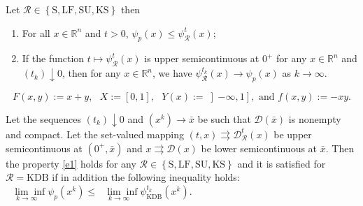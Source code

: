 \documentclass[10pt,a4paper]{amsart}
\begin{document}
\begin{theorem} \label{fprop}
Let $\mathcal{R}\in \left\{\mbox{S}, \mbox{LF}, \mbox{SU}, \mbox{KS}\right\}$ then 
\begin{enumerate}
\item[$(a)$]  For all $x\in \mathbb{R}^n$ and $t>0$, $\psi_p(x) \leq \psi^t_{\mathcal{R}}(x)$;
\item[$(b)$] If the function  $t\mapsto\psi_{\mathcal{R}}^{t}(x)$ is  upper semicontinuous at $0^+$ for any $x\in \mathbb{R}^n$ and
	 $(t_{k})\downarrow0$, then for any $x\in\mathbb{R}^{n}$, we have
	$\psi_{\mathcal{R}}^{t_{k}}(x)\rightarrow\psi_{p}(x)$ as $k\rightarrow\infty$.
\end{enumerate}
\end{theorem}

\begin{equation}
F(x,y):=x+y,\text{ \ }X:=[0,1],\text{ \ }Y(x):=\left]  -\infty,1\right]
,\text{ and \ \ }f(x,y):=-xy. \label{e1}
\end{equation}

\begin{proposition} \label{cs}
Let the sequences $(t_{k})\downarrow0$ and $(x^{k}) \rightarrow \bar{x}$ be such that $\mathcal{D}(\bar{x})$ is
nonempty and compact. Let the set-valued mapping $(t,x) \rightrightarrows \mathcal{D}_\mathcal{R}^{t}(x)$ be  upper semicontinuous at $(0^+,\bar{x})$ and $x \rightrightarrows \mathcal{D}(x)$  be lower semicontinuous at $\bar{x}$. Then the property \eqref{e1} holds for any $\mathcal{R}\in \left\{\mbox{S}, \mbox{LF}, \mbox{SU}, \mbox{KS}\right\}$ and it is satisfied for $\mathcal{R} = \text{KDB}$ if in addition the following inequality holds: $\underset{k\rightarrow\infty}{\text{ }\lim\inf}\psi_{p}(x^{k})\leq \underset
{k\rightarrow\infty}{\text{ }\lim\inf}\psi_{\text{KDB}}^{t_{k}}(x^{k})$.
\end{proposition}
\end{document}

